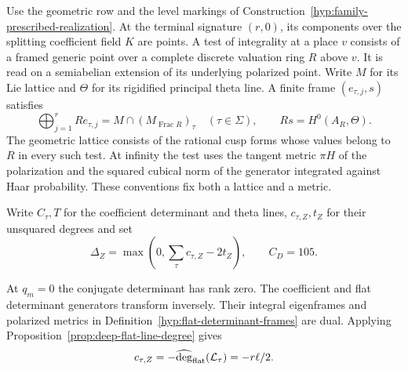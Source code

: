 \begin{definition}\label{hyp:terminal-cm-fibre-comparison}
Use the geometric row and the level markings of
Construction~\ref{hyp:family-prescribed-realization}. At the terminal signature
\((r,0)\), its components over the splitting coefficient field \(K\) are
points. A test of integrality at a place \(v\) consists of a framed generic point
over a complete discrete valuation ring \(R\) above \(v\).
It is read on a semiabelian extension of its underlying polarized point.
Write \(M\) for its Lie lattice and \(\Theta\) for its rigidified principal
theta line. A finite frame \((e_{\tau,j},s)\) satisfies
\[
  \bigoplus_{j=1}^r R e_{\tau,j}
      =M\cap(M_{\operatorname{Frac}R})_\tau
         \quad(\tau\in\Sigma),\qquad Rs=H^0(A_R,\Theta).
\] The geometric lattice consists of the rational cusp forms
whose values belong to \(R\) in every such test. At infinity the test
uses the tangent metric \(\pi H\) of the polarization and the squared
cubical norm of the generator integrated against Haar probability.
These conventions fix both a lattice and a metric.

Write \(C_\tau,T\) for the coefficient determinant and theta lines,
\(c_{\tau,Z},t_Z\) for their unsquared degrees and set
\[
 \Delta_Z=\max\!\left(0,\sum_\tau c_{\tau,Z}-2t_Z\right),
 \qquad C_D=105 .
\]
\end{definition}

At \(q_m=0\) the conjugate determinant has rank zero. The coefficient
and flat determinant generators transform inversely. Their integral
eigenframes and polarized metrics in
Definition~\ref{hyp:flat-determinant-frames} are dual. Applying
Proposition~\ref{prop:deep-flat-line-degree} gives
\[
       c_{\tau,Z}=-\widehat{\deg}_{\rm flat}(\mathcal L_\tau)
                  =-r\ell/2 .
\]

